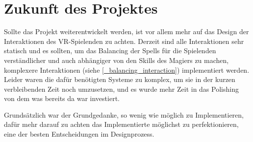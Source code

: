 \section{Zukunft des Projektes}

Sollte das Projekt weiterentwickelt werden, ist vor allem mehr auf das Design der Interaktionen des VR-Spielenden zu achten. Derzeit sind alle Interaktionen sehr statisch und es sollten, um das Balancing der Spells für die Spielenden verständlicher und auch abhängiger von den Skills des Magiers zu machen, komplexere Interaktionen (siehe \ref{_balancing_interaction}) implementiert werden. Leider waren die dafür benötigten Systeme zu komplex, um sie in der kurzen verbleibenden Zeit noch umzusetzen, und es wurde mehr Zeit in das Polishing von dem was bereits da war investiert.

Grundsätzlich war der Grundgedanke, so wenig wie möglich zu Implementieren, dafür mehr darauf zu achten das Implementierte möglichst zu perfektionieren, eine der besten Entscheidungen im Designprozess.